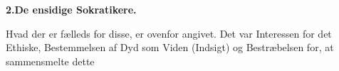 \documentclass[12pt,a4paper]{book}
\begin{document}
\begin{center}
\textbf{2.\enspace De ensidige Sokratikere.}
\end{center}
Hvad der er fælleds for disse, er ovenfor angivet. Det
var Interessen for det Ethiske, Bestemmelsen af Dyd som
Viden (Indsigt) og Bestræbelsen for, at sammensmelte dette
\end{document}
